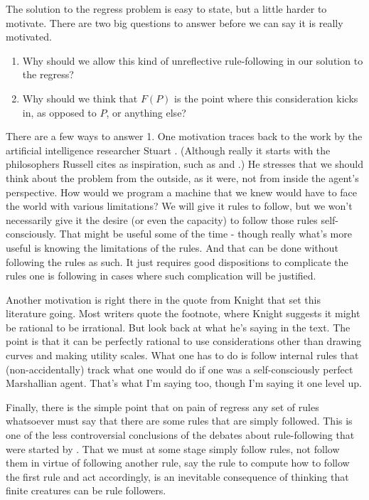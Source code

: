\documentclass[11pt,]{book}
\providecommand{\tightlist}{%
  \setlength{\itemsep}{0pt}\setlength{\parskip}{0pt}}
\begin{document}
The solution to the regress problem is easy to state, but a little harder to motivate. There are two big questions to answer before we can say it is really motivated.

\begin{enumerate}
\def\labelenumi{\arabic{enumi}.}
\tightlist
\item
  Why should we allow this kind of unreflective rule-following in our solution to the regress?
\item
  Why should we think that \(F(P)\) is the point where this consideration kicks in, as opposed to \(P\), or anything else?
\end{enumerate}

There are a few ways to answer 1. One motivation traces back to the work by the artificial intelligence researcher Stuart \citet{Russell1997}. (Although really it starts with the philosophers Russell cites as inspiration, such as \citet{Cherniak1986} and \citet{Harman1973}.) He stresses that we should think about the problem from the outside, as it were, not from inside the agent's perspective. How would we program a machine that we knew would have to face the world with various limitations? We will give it rules to follow, but we won't necessarily give it the desire (or even the capacity) to follow those rules self-consciously. That might be useful some of the time - though really what's more useful is knowing the limitations of the rules. And that can be done without following the rules as such. It just requires good dispositions to complicate the rules one is following in cases where such complication will be justified.

Another motivation is right there in the quote from Knight that set this literature going. Most writers quote the footnote, where Knight suggests it might be rational to be irrational. But look back at what he's saying in the text. The point is that it can be perfectly rational to use considerations other than drawing curves and making utility scales. What one has to do is follow internal rules that (non-accidentally) track what one would do if one was a self-consciously perfect Marshallian agent. That's what I'm saying too, though I'm saying it one level up.

Finally, there is the simple point that on pain of regress any set of rules whatsoever must say that there are some rules that are simply followed. This is one of the less controversial conclusions of the debates about rule-following that were started by \citet{Wittgenstein1953}. That we must at some stage simply follow rules, not follow them in virtue of following another rule, say the rule to compute how to follow the first rule and act accordingly, is an inevitable consequence of thinking that finite creatures can be rule followers.
\end{document}
